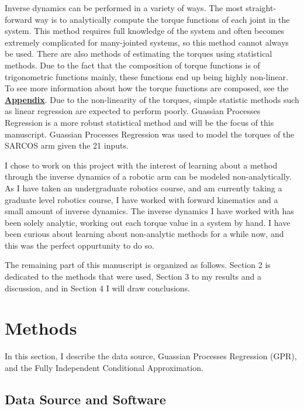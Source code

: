 \documentclass{article}
\begin{document}
    Inverse dynamics can be performed in a variety of ways. The most straight-forward way is to
    analytically compute the torque functions of each joint in the system. This method requires
    full knowledge of the system and often becomes extremely complicated for many-jointed
    systems, so this method cannot always be used. There are also methods of estimating the
    torques using statistical methods. Due to the fact that the composition of torque functions
    is of trigonometric functions mainly, these functions end up being highly non-linear. To see
    more information about how the torque functions are composed, see the
    \textbf{\hyperref[sec:appendix]{Appendix}}. Due to the non-linearity of the torques, simple
    statistic methods such as linear regression are expected to perform poorly. Guassian Processes
    Regression is a more robust statistical method and will be the focus of this manuscript.
    Guassian Processes Regression was used to model the torques of the SARCOS arm given the 21
    inputs.
    
    I chose to work on this project with the interest of learning about a method through
    the inverse dynamics of a robotic arm can be modeled non-analytically. As I have taken an
    undergraduate robotics course, and am currently taking a graduate level robotics course, I
    have worked with forward kinematics and a small amount of inverse dynamics. The inverse
    dynamics I have worked with has been solely analytic, working out each torque value in a system
    by hand. I have been curious about learning about non-analytic methods for a while now, and
    this was the perfect oppurtunity to do so.
    
    The remaining part of this manuscript is organized as follows. Section 2 is dedicated to the
    methods that were used, Section 3 to my results and a discussion, and in Section 4 I will
    draw conclusions.
    
    \clearpage
    
    \section{Methods}
    
    In this section, I describe the data source, Guassian Processes Regression (GPR), and the
    Fully Independent Conditional Approximation.
    
    \subsection{Data Source and Software}
    
\end{document}
